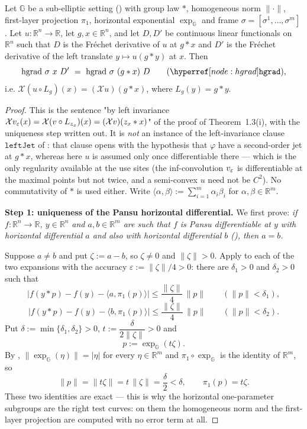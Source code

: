 \begin{lemma}
Let $\mathbb G$ be a sub-elliptic setting () with group law $*$,
homogeneous norm $\|\cdot\|$, first-layer projection $\pi_1$, horizontal exponential
$\exp_{\mathbb G}$ and frame $\sigma=[\sigma^1,\ldots,\sigma^m]$. Let
$u:\mathbb R^{n}\to\mathbb R$, let $g,x\in\mathbb R^{n}$, and let $D,D'$ be continuous
linear functionals on $\mathbb R^{n}$ such that $D$ is the Fréchet derivative of $u$ at
$g*x$ and $D'$ is the Fréchet derivative of the left translate $y\mapsto u(g*y)$ at $x$.
Then
\[
 \mathrm{hgrad}\ \sigma\ x\ D'\ =\ \mathrm{hgrad}\ \sigma\ (g*x)\ D
 \qquad(\noderef{hgrad}),
\]
i.e. $\mathcal X(u\circ L_g)(x)=(\mathcal Xu)(g*x)$, where $L_g(y)=g*y$.
\end{lemma}
\begin{proof}
This is the sentence "by left invariance $\mathcal Xv_\varepsilon(x)=\mathcal X(v\circ L_{z_x})(x)=(\mathcal Xv)(z_x*x)$"
of the proof of Theorem~1.3(i), with the uniqueness step written out. It is \emph{not} an
instance of the left-invariance clause $\mathtt{leftJet}$ of : that
clause opens with the hypothesis that $\varphi$ have a second-order jet at $g*x$, whereas
here $u$ is assumed only once differentiable there --- which is the only regularity
available at the use sites (the inf-convolution $v_\varepsilon$ is differentiable at the maximal
points but not twice, and a semi-convex $u$ need not be $C^{2}$). No commutativity of $*$ is
used either. Write $\langle\alpha,\beta\rangle:=\sum_{i=1}^{m}\alpha_i\beta_i$ for
$\alpha,\beta\in\mathbb R^{m}$.

\medskip\noindent\textbf{Step 1: uniqueness of the Pansu horizontal differential.} We first
prove: \emph{if $f:\mathbb R^{n}\to\mathbb R$, $y\in\mathbb R^{n}$ and
$a,b\in\mathbb R^{m}$ are such that $f$ is Pansu differentiable at $y$ with horizontal
differential $a$ and also with horizontal differential $b$ (), then
$a=b$.}

Suppose $a\ne b$ and put $\zeta:=a-b$, so $\zeta\ne0$ and $\|\zeta\|>0$. Apply
 to each of the two expansions with the accuracy
$\varepsilon:=\|\zeta\|/4>0$: there are $\delta_1>0$ and $\delta_2>0$ such that
\[
 \Big|f(y*p)-f(y)-\langle a,\pi_1(p)\rangle\Big|\le\frac{\|\zeta\|}4\,\|p\|
 \qquad(\|p\|<\delta_1), \tag{1}
\]
\[
 \Big|f(y*p)-f(y)-\langle b,\pi_1(p)\rangle\Big|\le\frac{\|\zeta\|}4\,\|p\|
 \qquad(\|p\|<\delta_2). \tag{2}
\]
Put $\delta:=\min\{\delta_1,\delta_2\}>0$, $t:=\dfrac{\delta}{2\|\zeta\|}>0$ and
\[
 p:=\exp_{\mathbb G}(t\zeta).
\]
By , $\|\exp_{\mathbb G}(\eta)\|=|\eta|$ for every
$\eta\in\mathbb R^{m}$ and $\pi_1\circ\exp_{\mathbb G}$ is the identity of $\mathbb R^{m}$,
so
\[
 \|p\|=\|t\zeta\|=t\,\|\zeta\|=\frac\delta2<\delta,\qquad \pi_1(p)=t\zeta . \tag{3}
\]
These two identities are exact --- this is why the horizontal one-parameter subgroups are the
right test curves: on them the homogeneous norm and the first-layer projection are computed
with no error term at all.


\end{proof}
